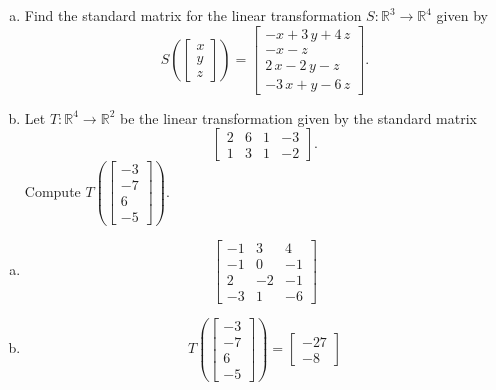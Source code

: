 
\begin{exerciseStatement}

\begin{enumerate}[(a)]
\item Find the standard matrix for the linear transformation \(S:\mathbb{R}^ 3  \to \mathbb{R}^ 4 \) given by \[S\left(  \left[\begin{array}{c}
x \\
y \\
z
\end{array}\right]  \right) =  \left[\begin{array}{c}
-x + 3 \, y + 4 \, z \\
-x - z \\
2 \, x - 2 \, y - z \\
-3 \, x + y - 6 \, z
\end{array}\right] .\]
\item Let \(T:\mathbb{R}^ 4  \to \mathbb{R}^ 2 \) be the linear transformation given by the standard matrix \[ \left[\begin{array}{cccc}
2 & 6 & 1 & -3 \\
1 & 3 & 1 & -2
\end{array}\right] .\] Compute \(T\left( \left[\begin{array}{c}
-3 \\
-7 \\
6 \\
-5
\end{array}\right]  \right)\). 
\end{enumerate}
    
\end{exerciseStatement}
    
\begin{exerciseAnswer} 

\begin{enumerate}[(a)]
\item \[ \left[\begin{array}{ccc}
-1 & 3 & 4 \\
-1 & 0 & -1 \\
2 & -2 & -1 \\
-3 & 1 & -6
\end{array}\right] \]
\item \[T\left( \left[\begin{array}{c}
-3 \\
-7 \\
6 \\
-5
\end{array}\right]  \right)= \left[\begin{array}{c}
-27 \\
-8
\end{array}\right] \]
\end{enumerate}
    
\end{exerciseAnswer}
    
